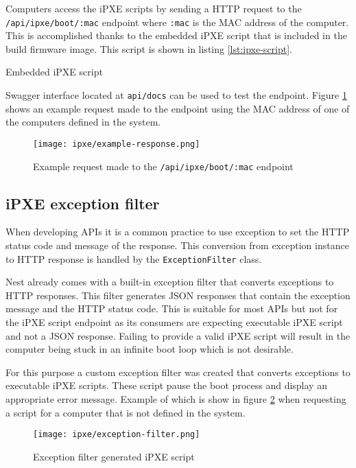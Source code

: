 \documentclass[../main.tex]{subfiles}
\begin{document}
Computers access the iPXE scripts by sending a HTTP request to the \texttt{/api/ipxe/boot/:mac} endpoint where \texttt{:mac} is the MAC address of the computer.
This is accomplished thanks to the embedded iPXE script that is included in the build firmware image. This script is shown in listing \ref{lst:ipxe-script}.

\begin{listing}[H]
  \caption{Embedded iPXE script}
  \label{lst:ipxe-script}
\end{listing}

Swagger interface located at \texttt{api/docs} can be used to test the endpoint. Figure \ref{fig:request-example} shows an example request made to the endpoint using the MAC address
of one of the computers defined in the system.

\begin{figure}[H]
  \centering
  \texttt{[image: ipxe/example-response.png]}
  \caption{Example request made to the \texttt{/api/ipxe/boot/:mac} endpoint}
  \label{fig:request-example}
\end{figure}

\subsection{iPXE exception filter}

When developing APIs it is a common practice to use exception to set the HTTP status code and message of the response.
This conversion from exception instance to HTTP response is handled by the \texttt{ExceptionFilter} class.

Nest already comes with a built-in exception filter that converts exceptions to HTTP responses.
This filter generates JSON responses that contain the exception message and the HTTP status code.
This is suitable for most APIs but not for the iPXE script endpoint as its consumers are expecting executable iPXE script and not a JSON response.
Failing to provide a valid iPXE script will result in the computer being stuck in an infinite boot loop which is not desirable.

For this purpose a custom exception filter was created that converts exceptions to executable iPXE scripts.
These script pause the boot process and display an appropriate error message.
Example of which is show in figure \ref{fig:exception-handling} when requesting a script for a computer that is not defined in the system.

\begin{figure}[H]
  \centering
  \texttt{[image: ipxe/exception-filter.png]}
  \caption{Exception filter generated iPXE script}
  \label{fig:exception-handling}
\end{figure}
\end{document}
